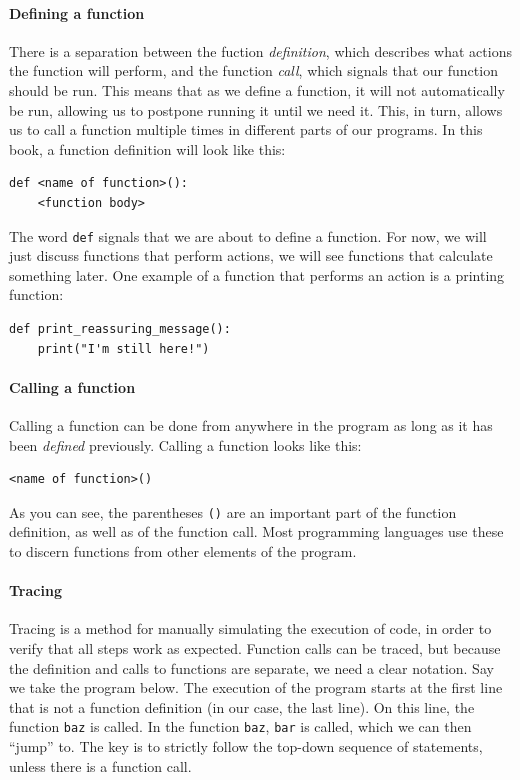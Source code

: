 \paragraph{Defining a function}

There is a separation between the fuction \emph{definition}, which describes what actions the function will perform, and the function \emph{call}, which signals that our function should be run. This means that as we define a function, it will not automatically be run, allowing us to postpone running it until we need it. This, in turn, allows us to call a function multiple times in different parts of our programs. In this book, a function definition will look like this:

\begin{verbatim}
def <name of function>():
    <function body>
\end{verbatim}

The word \texttt{def} signals that we are about to define a function. For now, we will just discuss functions that perform actions, we will see functions that calculate something later. One example of a function that performs an action is a printing function:

\begin{verbatim}
def print_reassuring_message():
    print("I'm still here!")
\end{verbatim}

\paragraph{Calling a function}

Calling a function can be done from anywhere in the program as long as it has been \emph{defined} previously. Calling a function looks like this:

\begin{verbatim}
<name of function>()
\end{verbatim}

As you can see, the parentheses \texttt{()} are an important part of the function definition, as well as of the function call. Most programming languages use these to discern functions from other elements of the program.


\paragraph{Tracing}
Tracing is a method for manually simulating the execution of code, in order to verify that all steps work as expected. Function calls can be traced, but because the definition and calls to functions are separate, we need a clear notation. Say we take the program below. The execution of the program starts at the first line that is not a function definition (in our case, the last line). On this line, the function \texttt{baz} is called. In the function \texttt{baz}, \texttt{bar} is called, which we can then ``jump''  to. The key is to strictly follow the top-down sequence of statements, unless there is a function call.

